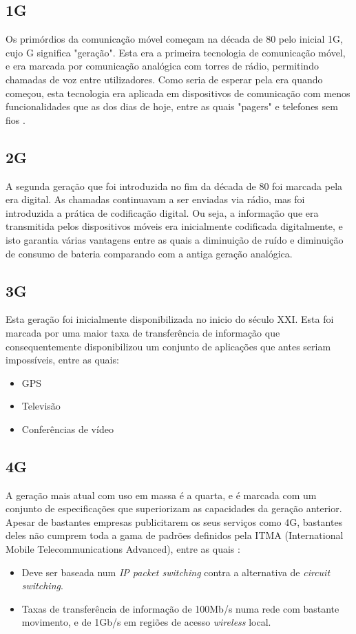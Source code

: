 \documentclass{llncs}
\begin{document}
\subsection{1G}
\hspace*{1.5em}Os primórdios da comunicação móvel começam na década de 80 pelo inicial 1G, cujo G significa "geração". Esta era a primeira tecnologia de comunicação móvel, e era marcada por comunicação analógica com torres de rádio, permitindo chamadas de voz entre utilizadores. Como seria de esperar pela era quando começou, esta tecnologia era aplicada em dispositivos de comunicação com menos funcionalidades que as dos dias de hoje, entre as quais "pagers" e telefones sem fios \cite{Ton:Pan:Kus}.
\subsection{2G}
\hspace*{1.5em}A segunda geração que foi introduzida no fim da década de 80 \cite{Ton:Pan:Kus} foi marcada pela era digital. As chamadas continuavam a ser enviadas via rádio, mas foi introduzida a prática de codificação digital. Ou seja, a informação que era transmitida pelos dispositivos móveis era inicialmente codificada digitalmente, e isto garantia várias vantagens entre as quais a diminuição de ruído e diminuição de consumo de bateria comparando com a antiga geração analógica.
\subsection{3G}
\hspace*{1.5em}Esta geração foi inicialmente disponibilizada no inicio do século XXI. Esta foi marcada por uma maior taxa de transferência de informação que consequentemente disponibilizou um conjunto de aplicações que antes seriam impossíveis, entre as quais:
\begin{itemize}
    \item GPS
    \item Televisão
    \item Conferências de vídeo
\end{itemize}
\subsection{4G}
\hspace*{1.5em}A geração mais atual com uso em massa é a quarta, e é marcada com um conjunto de especificações que superiorizam as capacidades da geração anterior. Apesar de bastantes empresas publicitarem os seus serviços como 4G, bastantes deles não cumprem toda a gama de padrões definidos pela ITMA (International Mobile Telecommunications Advanced), entre as quais \cite{standards}:
\begin{itemize}
    \item Deve ser baseada num \textit{IP packet switching} contra a alternativa de \textit{circuit switching}.
    \item Taxas de transferência de informação de 100Mb/s numa rede com bastante movimento, e de 1Gb/s em regiões de acesso \textit{wireless} local.
\end{itemize}
\end{document}
